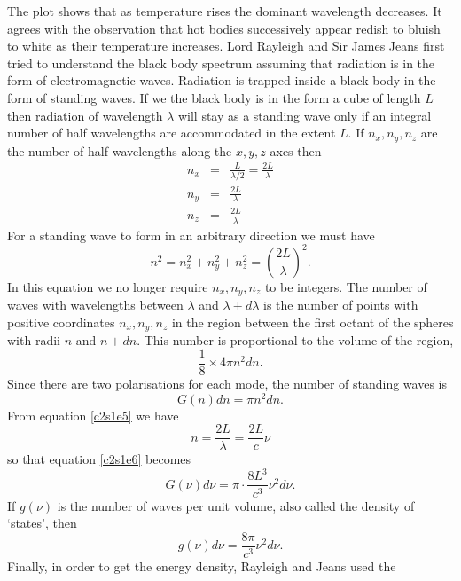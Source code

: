 The plot shows that as temperature
rises the dominant wavelength decreases. It agrees with the observation that
hot bodies successively appear redish to bluish to white as their temperature
increases. Lord Rayleigh and Sir James Jeans first tried to understand the
black body spectrum assuming that radiation is in the form of electromagnetic
waves. Radiation is trapped inside a black body in the form of standing waves.
If we the black body is in the form a cube of length $L$ then radiation of 
wavelength $\lambda$ will stay as a standing wave only if an integral number of
half wavelengths are accommodated in the extent $L$. If $n_x, n_y, n_z$ are the
number of half-wavelengths along the $x, y, z$ axes then
\begin{eqnarray}
n_x &=& \frac{L}{\lambda/2} = \frac{2L}{\lambda} \\
n_y &=& \frac{2L}{\lambda} \\
n_z &=& \frac{2L}{\lambda}
\end{eqnarray}
For a standing wave to form in an arbitrary direction we must have
\begin{equation}\label{c2s1e5}
n^2 = n_x^2 + n_y^2 + n_z^2 = \left(\frac{2L}{\lambda}\right)^2.
\end{equation}
In this equation we no longer require $n_x, n_y, n_z$ to be integers.
The number of waves with wavelengths between $\lambda$ and $\lambda + d\lambda$
is the number of points with positive coordinates $n_x, n_y, n_z$ in the region
between the first octant of the spheres with radii $n$ and $n + dn$. This number
is proportional to the volume of the region,
\[
\frac{1}{8} \times 4\pi n^2dn.
\]
Since there are two polarisations for each mode, the number of standing waves is
\begin{equation}\label{c2s1e6}
G(n)dn = \pi n^2 dn.
\end{equation}
From equation \eqref{c2s1e5} we have
\begin{equation}\label{c2s1e7}
n = \frac{2L}{\lambda} = \frac{2L}{c}\nu
\end{equation}
so that equation \eqref{c2s1e6} becomes
\begin{equation}\label{c2s1e8}
G(\nu)d\nu = \pi \cdot \frac{8L^3}{c^3}\nu^2d\nu.
\end{equation}
If $g(\nu)$ is the number of waves per unit volume, also called the density of
`states', then
\begin{equation}\label{c2s1e9}
g(\nu)d\nu = \frac{8\pi}{c^3}\nu^2 d\nu.
\end{equation}
Finally, in order to get the energy density, Rayleigh and Jeans used the 
